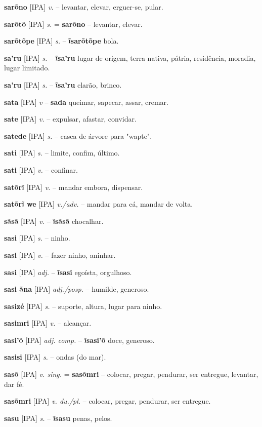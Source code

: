\textbf{sarõno} [IPA] \textit{v.} -- levantar, elevar, erguer-se, pular.

\textbf{sarõtõ} [IPA] \textit{s.} = \textbf{sarõno} -- levantar, elevar.

\textbf{sarõtõpe} [IPA] \textit{s.} -- \textbf{ĩsarõtõpe} bola.

\textbf{sa'ru} [IPA] \textit{s.} -- \textbf{ĩsa'ru} lugar de origem, terra nativa, pátria, residência, moradia, lugar limitado.

\textbf{sa'ru} [IPA] \textit{s.} -- \textbf{ĩsa'ru} clarão, brinco.

\textbf{sata} [IPA] \textit{v} -- \textbf{sada} queimar, sapecar, assar, cremar.

\textbf{sate} [IPA] \textit{v.} -- expulsar, afastar, convidar.

\textbf{satede} [IPA] \textit{s.} -- casca de árvore para "wapte".

\textbf{sati} [IPA] \textit{s.} -- limite, confim, último.

\textbf{sati} [IPA] \textit{v.} -- confinar.

\textbf{satõrĩ} [IPA] \textit{v.} -- mandar embora, dispensar.

\textbf{satõrĩ we} [IPA] \textit{v./adv.} -- mandar para cá, mandar de volta.

\textbf{sãsã} [IPA] \textit{v.} -- \textbf{ĩsãsã} chocalhar.

\textbf{sasi} [IPA] \textit{s.} -- ninho.

\textbf{sasi} [IPA] \textit{v.} -- fazer ninho, aninhar.

\textbf{sasi} [IPA] \textit{adj.} -- \textbf{ĩsasi} egoísta, orgulhoso.

\textbf{sasi ãna} [IPA] \textit{adj./posp.} -- humilde, generoso.

\textbf{sasizé} [IPA] \textit{s.} -- suporte, altura, lugar para ninho.

\textbf{sasimri} [IPA] \textit{v.} -- alcançar.

\textbf{sasi'õ} [IPA] \textit{adj. comp.} -- \textbf{ĩsasi'õ} doce, generoso.

\textbf{sasisi} [IPA] \textit{s.} -- ondas (do mar).

\textbf{sasõ} [IPA] \textit{v. sing.} = \textbf{sasõmri} -- colocar, pregar, pendurar, ser entregue, levantar, dar fé.

\textbf{sasõmri} [IPA] \textit{v. du./pl.} -- colocar, pregar, pendurar, ser entregue.

\textbf{sasu} [IPA] \textit{s.} -- \textbf{ĩsasu} penas, pelos.

